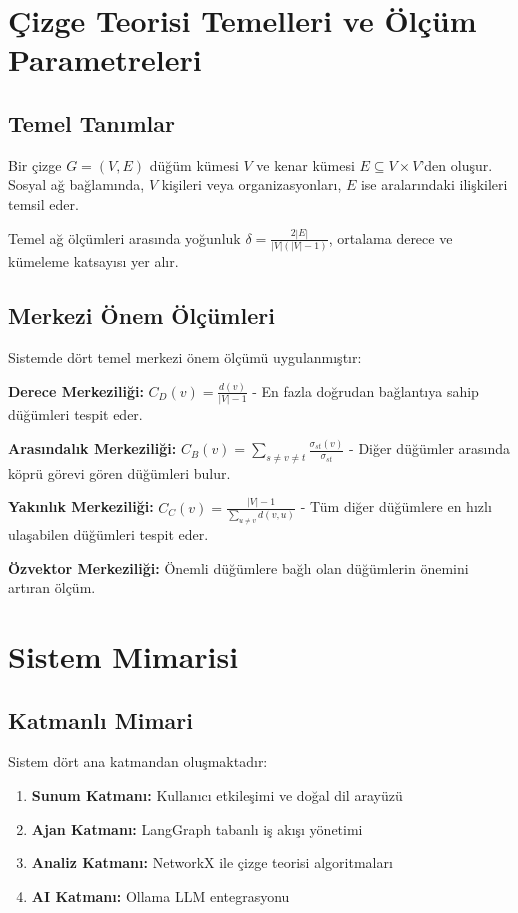 \documentclass[conference]{IEEEtran}
\begin{document}
\section{Çizge Teorisi Temelleri ve Ölçüm Parametreleri}

\subsection{Temel Tanımlar}

Bir çizge $G = (V, E)$ düğüm kümesi $V$ ve kenar kümesi $E \subseteq V \times V$'den oluşur. Sosyal ağ bağlamında, $V$ kişileri veya organizasyonları, $E$ ise aralarındaki ilişkileri temsil eder.

Temel ağ ölçümleri arasında yoğunluk $\delta = \frac{2|E|}{|V|(|V|-1)}$, ortalama derece ve kümeleme katsayısı yer alır.

\subsection{Merkezi Önem Ölçümleri}

Sistemde dört temel merkezi önem ölçümü uygulanmıştır:

\textbf{Derece Merkeziliği:} $C_D(v) = \frac{d(v)}{|V|-1}$ - En fazla doğrudan bağlantıya sahip düğümleri tespit eder.

\textbf{Arasındalık Merkeziliği:} $C_B(v) = \sum_{s \neq v \neq t} \frac{\sigma_{st}(v)}{\sigma_{st}}$ - Diğer düğümler arasında köprü görevi gören düğümleri bulur.

\textbf{Yakınlık Merkeziliği:} $C_C(v) = \frac{|V|-1}{\sum_{u \neq v} d(v,u)}$ - Tüm diğer düğümlere en hızlı ulaşabilen düğümleri tespit eder.

\textbf{Özvektor Merkeziliği:} Önemli düğümlere bağlı olan düğümlerin önemini artıran ölçüm.

\section{Sistem Mimarisi}

\subsection{Katmanlı Mimari}

Sistem dört ana katmandan oluşmaktadır:

\begin{enumerate}
\item \textbf{Sunum Katmanı:} Kullanıcı etkileşimi ve doğal dil arayüzü
\item \textbf{Ajan Katmanı:} LangGraph tabanlı iş akışı yönetimi
\item \textbf{Analiz Katmanı:} NetworkX ile çizge teorisi algoritmaları
\item \textbf{AI Katmanı:} Ollama LLM entegrasyonu
\end{enumerate}
\end{document}
